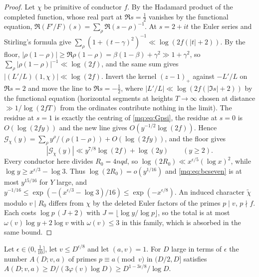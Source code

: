 \begin{proof}
Let $\chi$ be primitive of conductor $f$. By the Hadamard product of the completed function, whose real part at $\Re s=\frac12$ vanishes by the functional equation, $\Re(F'/F)(s)=\sum_\rho\Re(s-\rho)^{-1}$. At $s=2+it$ the Euler series and Stirling's formula give $\sum_\rho(1+(t-\gamma)^2)^{-1}\ll\log(2f(|t|+2))$. By the floor, $|\rho(1-\rho)|\ge\Re\rho(1-\rho)=\beta(1-\beta)+\gamma^2\gg1+\gamma^2$, so $\sum_\rho|\rho(1-\rho)|^{-1}\ll\log(2f)$, and the same sum gives $|(L'/L)(1,\chi)|\ll\log(2f)$. Invert the kernel $(z-1)_+$ against $-L'/L$ on $\Re s=2$ and move the line to $\Re s=-\frac12$, where $|L'/L|\ll\log(2f(|\Im s|+2))$ by the functional equation (horizontal segments at heights $T\to\infty$ chosen at distance $\gg1/\log(2fT)$ from the ordinates contribute nothing in the limit). The residue at $s=1$ is exactly the centring of \eqref{mq:eq:Gpsi}, the residue at $s=0$ is $O(\log(2fy))$ and the new line gives $O(y^{-1/2}\log(2f))$. Hence $\mathcal G_\chi(y)=\sum_\rho y^\rho/(\rho(1-\rho))+O(\log(2fy))$, and the floor gives
\begin{equation}\label{mq:eq:bcseven}
|\mathcal G_\chi(y)|\ll y^{7/8}\log(2f)+\log(2y)\qquad(y\ge2).
\end{equation}
Every conductor here divides $R_0=4nqd$, so $\log(2R_0)\ll x^{\epsilon/5}(\log x)^2$, while $\log y\ge x^{\epsilon/3}-\log3$. Thus $\log(2R_0)=o(y^{1/16})$ and \eqref{mq:eq:bcseven} is at most $y^{15/16}$ for $Y$ large, and $y^{-1/16}\le\exp(-(x^{\epsilon/3}-\log3)/16)\le\exp(-x^{\epsilon/8})$. An induced character $\widetilde\chi$ modulo $v\mid R_0$ differs from $\chi$ by the deleted Euler factors of the primes $p\mid v$, $p\nmid f$. Each costs $\log p\,(J+2)$ with $J=\lfloor\log y/\log p\rfloor$, so the total is at most $\omega(v)\log y+2\log v$ with $\omega(v)\le3$ in this family, which is absorbed in the same bound.
\end{proof}

\begin{lemma}\label{mq:lem:progressions}
Let $\epsilon\in(0,\frac1{10}]$, let $v\le D^{\epsilon/8}$ and let $(a,v)=1$. For $D$ large in terms of $\epsilon$ the number $A(D;v,a)$ of primes $p\equiv a\pmod v$ in $(D/2,D]$ satisfies $A(D;v,a)\ge D/(3\varphi(v)\log D)\ge D^{1-3\epsilon/8}/\log D$.
\end{lemma}

